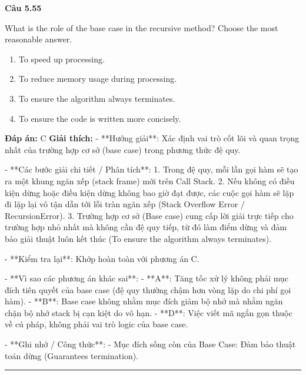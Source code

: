 \documentclass[11pt,a4paper]{article}
\newenvironment{question}[1]{%
  \par\vspace{1em}\noindent\textbf{\large Câu #1}\par\vspace{0.4em}
}{%
  \par\vspace{1em}\hrule\vspace{0.6em}
}
\newenvironment{choices}{%
  \begin{enumerate}[label=\textbf{\Alph*.},leftmargin=2.2em,itemsep=2pt,topsep=3pt]
}{%
  \end{enumerate}
}
\newcommand{\choice}{\item}
\begin{document}
\begin{question}{5.55}
What is the role of the base case in the recursive method? Choose the most reasonable answer.
\begin{choices}
\choice To speed up processing.
\choice To reduce memory usage during processing.
\choice To ensure the algorithm always terminates.
\choice To ensure the code is written more concisely.
\end{choices}
\textbf{Đáp án:} C
\textbf{Giải thích:} - **Hướng giải**:
  Xác định vai trò cốt lõi và quan trọng nhất của trường hợp cơ sở (base case) trong phương thức đệ quy.

- **Các bước giải chi tiết / Phân tích**:
  1. Trong đệ quy, mỗi lần gọi hàm sẽ tạo ra một khung ngăn xếp (stack frame) mới trên Call Stack.
  2. Nếu không có điều kiện dừng hoặc điều kiện dừng không bao giờ đạt được, các cuộc gọi hàm sẽ lặp đi lặp lại vô tận dẫn tới lỗi tràn ngăn xếp (Stack Overflow Error / RecursionError).
  3. Trường hợp cơ sở (Base case) cung cấp lời giải trực tiếp cho trường hợp nhỏ nhất mà không cần đệ quy tiếp, từ đó làm điểm dừng và đảm bảo giải thuật luôn kết thúc (To ensure the algorithm always terminates).

- **Kiểm tra lại**:
  Khớp hoàn toàn với phương án C.

- **Vì sao các phương án khác sai**:
  - **A**: Tăng tốc xử lý không phải mục đích tiên quyết của base case (đệ quy thường chậm hơn vòng lặp do chi phí gọi hàm).
  - **B**: Base case không nhằm mục đích giảm bộ nhớ mà nhằm ngăn chặn bộ nhớ stack bị cạn kiệt do vô hạn.
  - **D**: Việc viết mã ngắn gọn thuộc về cú pháp, không phải vai trò logic của base case.

- **Ghi nhớ / Công thức**:
  - Mục đích sống còn của Base Case: Đảm bảo thuật toán dừng (Guarantees termination).
\end{question}
\end{document}
